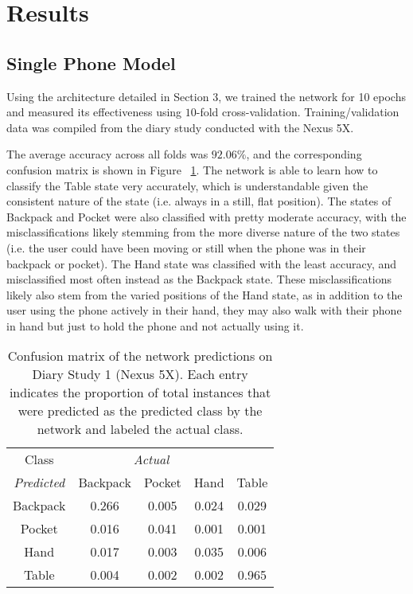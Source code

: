 \section{Results}
\subsection{Single Phone Model}
Using the architecture detailed in Section 3, we trained the network for 10 epochs
and measured its effectiveness using $10$-fold cross-validation.
Training/validation data was compiled from the diary study conducted with the Nexus 5X.

The average accuracy across all folds was $92.06\%$, and the corresponding
confusion matrix is shown in Figure ~\ref{fig:confusion1}. The network is able to learn how to 
classify the Table state very accurately, which is understandable given 
the consistent nature of the state (i.e. always in a still, flat position). The states
of Backpack and Pocket were also classified with pretty moderate accuracy,
with the misclassifications likely stemming from the more diverse nature of 
the two states (i.e. the user could have been moving or still when the phone was
in their backpack or pocket). The Hand state was classified with the least accuracy,
and misclassified most often instead as the Backpack state. These misclassifications
likely also stem from the varied positions of the Hand state, as in addition to the user
using the phone actively in their hand, they may also walk with their phone in hand
but just to hold the phone and not actually using it.

\begin{table}[h]
\caption{Confusion matrix of the network predictions on Diary Study 1 (Nexus 5X). Each entry indicates the proportion of
total instances that were predicted as the predicted class by the network and labeled the actual class.}\label{fig:confusion1} \centering
\begin{tabular}{| c || c | c | c | c |}  
\toprule
Class &  \multicolumn{3}{c}{\textit{Actual}} \\
\cmidrule{1-5}
\textit{Predicted}		&	Backpack    & 	Pocket 	& 	Hand	&	Table \\
\midrule
Backpack			&	0.266 	&	0.005	&	0.024 	&	0.029 \\
Pocket			&	0.016 	&	0.041 	&	0.001 	&	0.001 \\
Hand			&	0.017 	&	0.003 	&	0.035 	&	0.006 \\
Table			&	0.004 	&	0.002 	&	0.002 	&	0.965\\
\bottomrule
\end{tabular}
\end{table}


